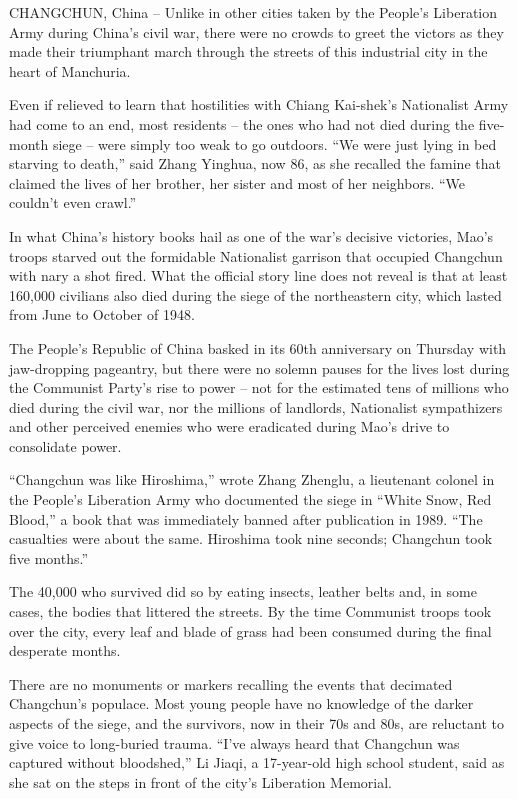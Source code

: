 ﻿\documentclass[12pt]{article}
\begin{document}
\lettrine{C}{HANGCHUN}, China -- Unlike in other cities taken by the People's
Liberation Army during China's civil war, there were no crowds to greet the victors as they made
their triumphant march through the streets of this industrial city in the heart of Manchuria.

Even if relieved to learn that hostilities with Chiang Kai-shek's Nationalist Army had come to an
end, most residents -- the ones who had not died during the five-month siege -- were simply too weak
to go outdoors. ``We were just lying in bed starving to death,'' said Zhang Yinghua, now 86, as she
recalled the famine that claimed the lives of her brother, her sister and most of her neighbors.
``We couldn't even crawl.''

In what China's history books hail as one of the war's decisive victories, Mao's troops starved out
the formidable Nationalist garrison that occupied Changchun with nary a shot fired. What the
official story line does not reveal is that at least 160,000 civilians also died during the siege of
the northeastern city, which lasted from June to October of 1948.

The People's Republic of China basked in its 60th anniversary on Thursday with jaw-dropping
pageantry, but there were no solemn pauses for the lives lost during the Communist Party's rise to
power -- not for the estimated tens of millions who died during the civil war, nor the millions of
landlords, Nationalist sympathizers and other perceived enemies who were eradicated during Mao's
drive to consolidate power.

``Changchun was like Hiroshima,'' wrote Zhang Zhenglu, a lieutenant colonel in the People's
Liberation Army who documented the siege in ``White Snow, Red Blood,'' a book that was immediately
banned after publication in 1989. ``The casualties were about the same. Hiroshima took nine seconds;
Changchun took five months.''

The 40,000 who survived did so by eating insects, leather belts and, in some cases, the bodies that
littered the streets. By the time Communist troops took over the city, every leaf and blade of grass
had been consumed during the final desperate months.

There are no monuments or markers recalling the events that decimated Changchun's populace. Most
young people have no knowledge of the darker aspects of the siege, and the survivors, now in their
70s and 80s, are reluctant to give voice to long-buried trauma. ``I've always heard that Changchun
was captured without bloodshed,'' Li Jiaqi, a 17-year-old high school student, said as she sat on
the steps in front of the city's Liberation Memorial.
\end{document}
